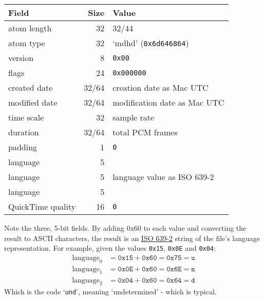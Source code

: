 \begin{table}[h]
\begin{tabular}{|l|r|l|}
\hline
Field & Size & Value \\
\hline
atom length & 32 & 32/44 \\
atom type & 32 & `mdhd' (\texttt{0x6d646864}) \\
\hline
version & 8 & \texttt{0x00} \\
flags & 24 & \texttt{0x000000} \\
created date & 32/64 & creation date as Mac UTC \\
modified date & 32/64 & modification date as Mac UTC \\
time scale & 32 & sample rate \\
duration & 32/64 & total PCM frames \\
padding & 1 & \texttt{0} \\
language & 5 & \\
language & 5 & language value as ISO 639-2 \\
language & 5 & \\
QuickTime quality & 16 & \texttt{0} \\
\hline
\end{tabular}
\end{table}
Note the three, 5-bit  fields.
By adding 0x60 to each value and converting the result to ASCII characters,
the result is an \href{http://www.loc.gov/standards/iso639-2/}{ISO 639-2}
string of the file's language representation.
For example, given the values \texttt{0x15}, \texttt{0x0E} and \texttt{0x04}:
\begin{align*}
\text{language}_0 &= \texttt{0x15} + \texttt{0x60} = \texttt{0x75} = \texttt{u} \\
\text{language}_1 &= \texttt{0x0E} + \texttt{0x60} = \texttt{0x6E} = \texttt{n} \\
\text{language}_2 &= \texttt{0x04} + \texttt{0x60} = \texttt{0x64} = \texttt{d}
\end{align*}
Which is the code `\texttt{und}', meaning `undetermined' - which is typical.

\clearpage

